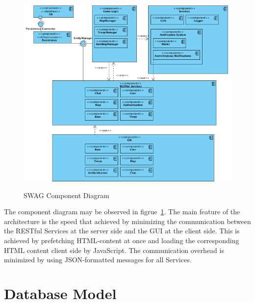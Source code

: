 \documentclass[a4paper]{article}
\begin{document}
\begin{figure}[ht!]
  \begin{center}
  \hspace*{-90pt}
  \includegraphics[scale=0.60]{fig/components.png}
  \label{fig:component_diagram}
  \caption{SWAG Component Diagram}
  \end{center}
\end{figure}

\hspace*{0pt}

The component diagram may be observed in figrue~\ref{fig:component_diagram}. The main feature of the architecture is the speed that achieved by minimizing the communication between the RESTful Services at the server side and the GUI at the client side. This is achieved by prefetching HTML-content at once and loading the corresponding HTML content client side by JavaScript. The communication overhead is minimized by using JSON-formatted messages for all Services.

\clearpage


\section{Database Model}
\end{document}
